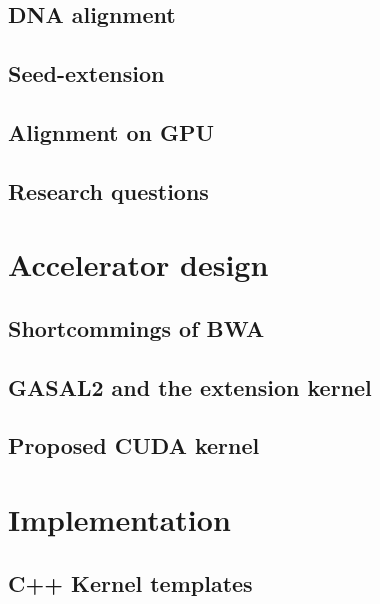 \documentclass[11pt,a4paper]{report}
\begin{document}
		\section{DNA alignment}
		
		
		\section{Seed-extension}
		
		
		\section{Alignment on GPU}
		
		
		\section{Research questions}
		
		
	\chapter{Accelerator design}
	\label{chap:accel}
		
		
		\section{Shortcommings of BWA}
		
		\section{GASAL2 and the extension kernel}
			
		
		\section{Proposed CUDA kernel}
		
	
	\chapter{Implementation}
	\label{chap:implementation}
	
		
		\section{C++ Kernel templates}
		
	
\end{document}
